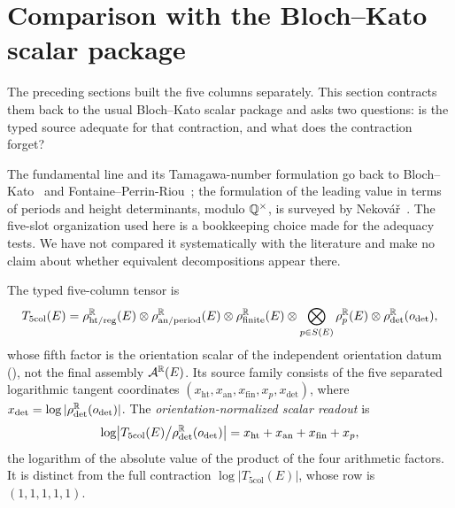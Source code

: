 \section[Comparison with the Bloch--Kato scalar package]{Comparison with the Bloch--Kato scalar package}
\label{sec:comparison}

The preceding sections built the five columns separately.  This section
contracts them back to the usual Bloch--Kato scalar package and asks two
questions: is the typed source adequate for that contraction, and what
does the contraction forget?

\begin{remark}\label{rmk:apparatus:five-column-literature-gap}
The fundamental line and its Tamagawa-number formulation go back to
Bloch--Kato~\citep[\S5]{BlochKato1990} and
Fontaine--Perrin-Riou~\citep{FontainePerrinRiou1994}; the formulation of
the leading value in terms of periods and height determinants, modulo
$\mathbb{Q}^\times$, is surveyed by Nekov\'a\v{r}~\citep{Nekovar1994}.  The
five-slot organization used here is a bookkeeping choice made for the
adequacy tests.  We have not compared it systematically with the
literature and make no claim about whether equivalent decompositions
appear there.
\end{remark}

\begin{definition}\label{def:apparatus:five-column-tensor}
The typed five-column tensor is
\[
  T_{\mathrm{5col}}(E)
  =
  \rho_{\mathrm{ht/reg}}^{\mathbb{R}}(E)
  \otimes
  \rho_{\mathrm{an/period}}^{\mathbb{R}}(E)
  \otimes
  \rho_{\mathrm{finite}}^{\mathbb{R}}(E)
  \otimes
  \bigotimes_{p\in S(E)}\rho_p^{\mathbb{R}}(E)
  \otimes
  \rho_{\det}^{\mathbb{R}}(o_{\det}),
\]
whose fifth factor is the orientation scalar of the independent
orientation datum (), not the final
assembly $\mathcal A^{\mathbb{R}}(E)$.  Its source family consists of the five
separated logarithmic tangent coordinates
$(x_{\mathrm{ht}},x_{\mathrm{an}},x_{\mathrm{fin}},x_p,x_{\det})$, where
$x_{\det}=\log|\rho_{\det}^{\mathbb{R}}(o_{\det})|$.  The
\emph{orientation-normalized scalar readout} is
\[
  \log\bigl|T_{\mathrm{5col}}(E)\big/\rho_{\det}^{\mathbb{R}}(o_{\det})\bigr|
  =x_{\mathrm{ht}}+x_{\mathrm{an}}+x_{\mathrm{fin}}+x_p ,
\]
the logarithm of the absolute value of the product of the four arithmetic
factors.  It is distinct from the full contraction
$\log|T_{\mathrm{5col}}(E)|$, whose row is $(1,1,1,1,1)$.
\end{definition}

